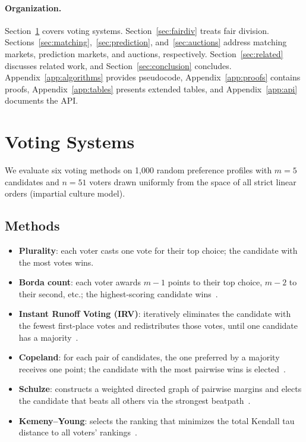 \documentclass[10pt]{article}
\begin{document}
\paragraph{Organization.}
Section~\ref{sec:voting} covers voting systems. Section~\ref{sec:fairdiv} treats fair division. Sections~\ref{sec:matching},~\ref{sec:prediction}, and~\ref{sec:auctions} address matching markets, prediction markets, and auctions, respectively. Section~\ref{sec:related} discusses related work, and Section~\ref{sec:conclusion} concludes. Appendix~\ref{app:algorithms} provides pseudocode, Appendix~\ref{app:proofs} contains proofs, Appendix~\ref{app:tables} presents extended tables, and Appendix~\ref{app:api} documents the API.

\section{Voting Systems}
\label{sec:voting}

We evaluate six voting methods on 1{,}000 random preference profiles with $m=5$ candidates and $n=51$ voters drawn uniformly from the space of all strict linear orders (impartial culture model).

\subsection{Methods}
\begin{itemize}[leftmargin=*,itemsep=1pt]
  \item \textbf{Plurality}: each voter casts one vote for their top choice; the candidate with the most votes wins.
  \item \textbf{Borda count}: each voter awards $m-1$ points to their top choice, $m-2$ to their second, etc.; the highest-scoring candidate wins~\citep{borda1781memoire}.
  \item \textbf{Instant Runoff Voting (IRV)}: iteratively eliminates the candidate with the fewest first-place votes and redistributes those votes, until one candidate has a majority~\citep{tideman2006collective}.
  \item \textbf{Copeland}: for each pair of candidates, the one preferred by a majority receives one point; the candidate with the most pairwise wins is elected~\citep{copeland1951reasonable}.
  \item \textbf{Schulze}: constructs a weighted directed graph of pairwise margins and elects the candidate that beats all others via the strongest beatpath~\citep{schulze2011new}.
  \item \textbf{Kemeny--Young}: selects the ranking that minimizes the total Kendall tau distance to all voters' rankings~\citep{kemeny1959mathematics, young1978consistent}.
\end{itemize}
\end{document}
